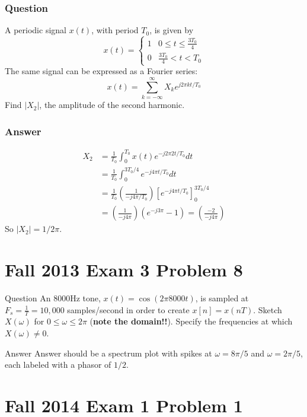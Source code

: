 \documentclass{beamer}
\begin{document}
\begin{frame}
  \frametitle{Question}
  A periodic signal $x(t)$, with period $T_0$, is given by
  \[
  x(t)=\left\{\begin{array}{ll}1 &0\le t\le \frac{3T_0}{4}\\
  0 & \frac{3T_0}{4}<t<T_0\end{array}\right.
  \]
  The same signal can be expressed as a Fourier series:
  \[
  x(t)=\sum_{k=-\infty}^\infty X_ke^{j2\pi kt/T_0}
  \]
  Find $|X_2|$, the amplitude of the second harmonic.
\end{frame}


\begin{frame}
  \frametitle{Answer}
  \begin{align*}
    X_2 &= \frac{1}{T_0}\int_0^{T_0}x(t)e^{-j2\pi 2t/T_0}dt\\
    &= \frac{1}{T_0}\int_0^{3T_0/4}e^{-j4\pi t/T_0}dt\\
    &= \frac{1}{T_0}\left(\frac{1}{-j4\pi/T_0}\right)\left[e^{-j4\pi t/T_0}\right]_0^{3T_0/4}\\
    &= \left(\frac{1}{-j4\pi}\right)\left(e^{-j3\pi}-1\right)
    = \left(\frac{-2}{-j4\pi}\right)
  \end{align*}
  So $|X_2|=1/2\pi$.
\end{frame}

\section[13x3p8]{Fall 2013 Exam 3 Problem 8}
\setcounter{subsection}{1}

\begin{frame}
  \begin{block}{Question}
  An 8000Hz tone, $x(t)=\cos(2\pi 8000t)$, is sampled at
  $F_s=\frac{1}{T}=10,000$ samples/second in order to create
  $x[n]=x(nT)$.  Sketch $X(\omega)$ for $0\le\omega\le 2\pi$ ({\bf note
    the domain!!}). Specify the frequencies at which $X(\omega)\ne 0$.
  \end{block}
  \begin{block}{Answer}
    Answer should be a spectrum plot with spikes at $\omega=8\pi/5$ and
    $\omega=2\pi/5$, each labeled with a phasor of $1/2$.
  \end{block}
\end{frame}

\section[14x1p1]{Fall 2014 Exam 1 Problem 1}
\setcounter{subsection}{1}
\end{document}
